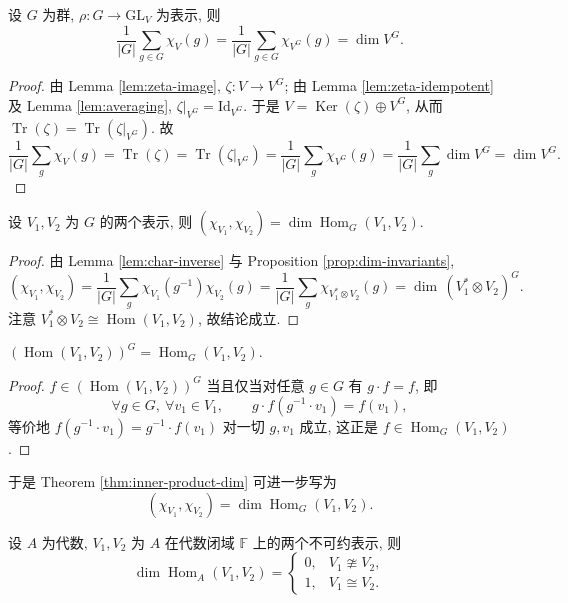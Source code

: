 \begin{proposition}\label{prop:dim-invariants}
设 $G$ 为群, $\rho\colon G\to\mathrm{GL}_V$ 为表示, 则
\[
  \frac{1}{|G|}\sum_{g\in G}\chi_V(g)
  =\frac{1}{|G|}\sum_{g\in G}\chi_{V^G}(g)=\dim V^G .
\]
\end{proposition}

\begin{proof}
由 Lemma \ref{lem:zeta-image}, $\zeta\colon V\to V^G$; 由 Lemma \ref{lem:zeta-idempotent}
及 Lemma \ref{lem:averaging}, $\zeta|_{V^G}=\mathrm{Id}_{V^G}$.
于是 $V=\operatorname{Ker}(\zeta)\oplus V^G$, 从而 $\operatorname{Tr}(\zeta)=\operatorname{Tr}(\zeta|_{V^G})$. 故
\[
  \frac{1}{|G|}\sum_{g}\chi_V(g)=\operatorname{Tr}(\zeta)
  =\operatorname{Tr}(\zeta|_{V^G})=\frac{1}{|G|}\sum_{g}\chi_{V^G}(g)
  =\frac{1}{|G|}\sum_{g}\dim V^G=\dim V^G .
\]
\end{proof}

\begin{theorem}\label{thm:inner-product-dim}
设 $V_1,V_2$ 为 $G$ 的两个表示, 则
$(\chi_{V_1},\chi_{V_2})=\dim\operatorname{Hom}_G(V_1,V_2)$.
\end{theorem}

\begin{proof}
由 Lemma \ref{lem:char-inverse} 与 Proposition \ref{prop:dim-invariants},
\[
  (\chi_{V_1},\chi_{V_2})=\frac{1}{|G|}\sum_{g}\chi_{V_1}(g^{-1})\chi_{V_2}(g)
  =\frac{1}{|G|}\sum_{g}\chi_{V_1^*\otimes V_2}(g)=\dim\,(V_1^*\otimes V_2)^G .
\]
注意 $V_1^*\otimes V_2\cong\operatorname{Hom}(V_1,V_2)$, 故结论成立.
\end{proof}

\begin{lemma}\label{lem:hom-fixed}
$(\operatorname{Hom}(V_1,V_2))^G=\operatorname{Hom}_G(V_1,V_2)$.
\end{lemma}

\begin{proof}
$f\in(\operatorname{Hom}(V_1,V_2))^G$ 当且仅当对任意 $g\in G$ 有 $g\cdot f=f$, 即
\[
  \forall g\in G,\ \forall v_1\in V_1,\qquad g\cdot f(g^{-1}\cdot v_1)=f(v_1),
\]
等价地 $f(g^{-1}\cdot v_1)=g^{-1}\cdot f(v_1)$ 对一切 $g,v_1$ 成立, 这正是
$f\in\operatorname{Hom}_G(V_1,V_2)$.
\end{proof}

于是 Theorem \ref{thm:inner-product-dim} 可进一步写为
\[
  (\chi_{V_1},\chi_{V_2})=\dim\operatorname{Hom}_G(V_1,V_2).
\]

\begin{lemma}[Schur]\label{lem:schur}
设 $A$ 为代数, $V_1,V_2$ 为 $A$ 在代数闭域 $\mathbb{F}$ 上的两个不可约表示, 则
\[
  \dim\operatorname{Hom}_A(V_1,V_2)=
  \begin{cases}
    0, & V_1\ncong V_2,\\
    1, & V_1\cong V_2.
  \end{cases}
\]
\end{lemma}

